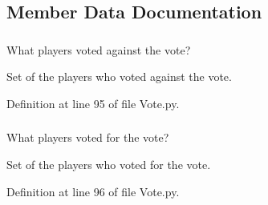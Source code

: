 \subsection{Member Data Documentation}
\hypertarget{class_vote_1_1_vote_ad28b3d5cd63141ad2e23a900927724e6}{
\subsubsection[{\_\-\_\-players\_\-voted\_\-no}]{}}
\label{class_vote_1_1_vote_ad28b3d5cd63141ad2e23a900927724e6}


What players voted against the vote? 

Set of the players who voted against the vote. 

Definition at line 95 of file Vote.py.

\hypertarget{class_vote_1_1_vote_a6a3289f868e2d8898c27e6905fe68e19}{
\subsubsection[{\_\-\_\-players\_\-voted\_\-yes}]{}}
\label{class_vote_1_1_vote_a6a3289f868e2d8898c27e6905fe68e19}


What players voted for the vote? 

Set of the players who voted for the vote. 

Definition at line 96 of file Vote.py.

\hypertarget{class_vote_1_1_vote_a7540d71a94e58d4a4877a8a949232fe3}{
\subsubsection[{action}]{}}
\label{class_vote_1_1_vote_a7540d71a94e58d4a4877a8a949232fe3}


